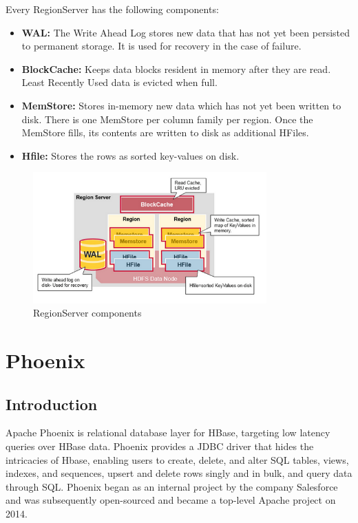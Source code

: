 Every RegionServer has the following components:
\begin{itemize}
\item \textbf{WAL:} The Write Ahead Log stores new data that has not yet been persisted to permanent storage. It is used for recovery in the case of failure.
\item \textbf{BlockCache:} Keeps data blocks resident in memory after they are read. Least Recently Used data is evicted when full.
\item \textbf{MemStore:} Stores in-memory new data which has not yet been written to disk. There is one MemStore per column family per region. Once the MemStore fills, its contents are written to disk as additional HFiles.
\item \textbf{Hfile:} Stores the rows as sorted key-values on disk.
\end{itemize}

\begin{figure}[H]
\centering
\includegraphics[width=0.8\textwidth]{figures/hbase_regionserver_components}
\caption{RegionServer components}
\label{figure:hbase_regionserver_components}
\end{figure}


\section{Phoenix}

\subsection{Introduction}

Apache Phoenix \cite{phoenix} is relational database layer for HBase, targeting low latency queries over HBase data. Phoenix provides a JDBC driver that hides the intricacies of Hbase, enabling users to create, delete, and alter SQL tables, views, indexes, and sequences, upsert and delete rows singly and in bulk, and query data through SQL. Phoenix began as an internal project by the company Salesforce and was subsequently open-sourced and became a top-level Apache project on 2014.

